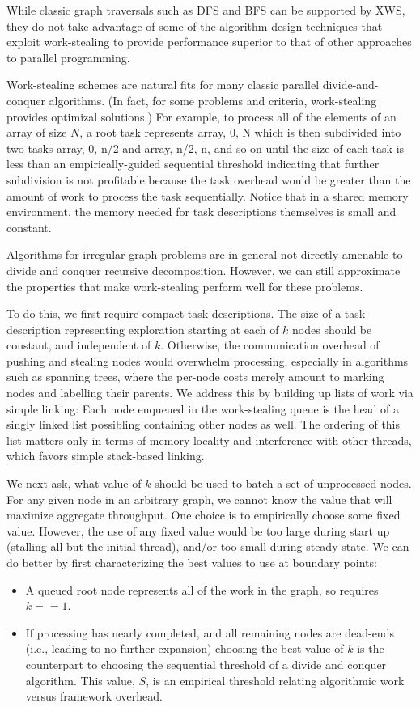 \twocolumn
While classic graph traversals such as DFS and BFS can be supported by
XWS, they do not take advantage of some of the algorithm design
techniques that exploit work-stealing to provide performance superior
to that of other approaches to parallel programming.

Work-stealing schemes are natural fits for many classic parallel
divide-and-conquer algorithms. (In fact, for some problems and
criteria, work-stealing provides optimizal solutions.) For example, to
process all of the elements of an array of size $N$, a root task
represents {array, 0, N} which is then subdivided into two tasks
{array, 0, n/2} and {array, n/2, n}, and so on until the size of each
task is less than an empirically-guided sequential threshold
indicating that further subdivision is not profitable because the task
overhead would be greater than the amount of work to process the task
sequentially. Notice that in a shared memory environment, the memory
needed for task descriptions themselves is small and constant.

Algorithms for irregular graph problems are in general not directly
amenable to divide and conquer recursive decomposition. However, we
can still approximate the properties that make work-stealing perform
well for these problems.

To do this, we first require compact task descriptions.  The size of a
task description representing exploration starting at each of $k$ nodes
should be constant, and independent of $k$. Otherwise, the communication
overhead of pushing and stealing nodes would overwhelm processing,
especially in algorithms such as spanning trees, where the per-node
costs merely amount to marking nodes and labelling their parents.  We
address this by building up lists of work via simple linking: Each
node enqueued in the work-stealing queue is the head of a singly
linked list possibling containing other nodes as well. The ordering of
this list matters only in terms of memory locality and interference
with other threads, which favors simple stack-based linking.

We next ask, what value of $k$ should be used to batch a set of
unprocessed nodes. For any given node in an arbitrary graph, we cannot
know the value that will maximize aggregate throughput.
One choice is to empirically choose some fixed value. However,
the use of any fixed value would be too large during start up
(stalling all but the initial thread), and/or too small during
steady state. We can do better by first characterizing the
best values to use at boundary points:
\begin{itemize}
  \item A queued root node represents all of the work in the graph, so
    requires $k == 1$.
  \item If processing has nearly completed, and all remaining nodes are
    dead-ends (i.e., leading to no further expansion) choosing the
    best value of $k$ is the counterpart to choosing the sequential
    threshold of a divide and conquer algorithm.  This value, $S$, is an
    empirical threshold relating algorithmic work versus framework
    overhead.  
\end{itemize}

